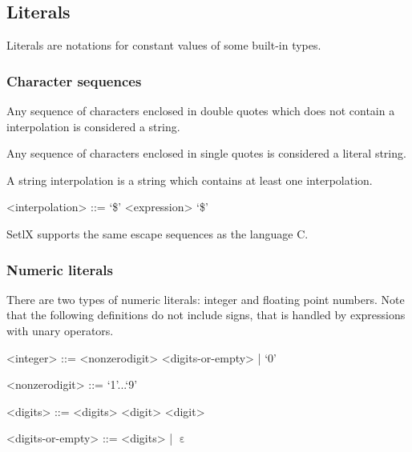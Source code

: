 %
%
\subsection{Literals}

Literals are notations for constant values of some built-in types.

%
\subsubsection{Character sequences}


Any sequence of characters enclosed in double quotes which does not contain a interpolation is considered a string.


Any sequence of characters enclosed in single quotes is considered a literal string.


A string interpolation is a string which contains at least one interpolation.

\begin{grammar}
<interpolation> ::= `\$' <expression> `\$'
\end{grammar}


SetlX supports the same escape sequences as the language C.

%
\subsubsection{Numeric literals}

There are two types of numeric literals: integer and floating point numbers. Note that the following definitions do not include signs, that is handled by expressions with unary operators.


\begin{grammar}
<integer> ::=  <nonzerodigit> <digits-or-empty> | `0'

<nonzerodigit>   ::=  `1'...`9'

<digits> ::= <digits> <digit>
\alt <digit>

<digits-or-empty> ::= <digits> | $\upepsilon$
\end{grammar}


